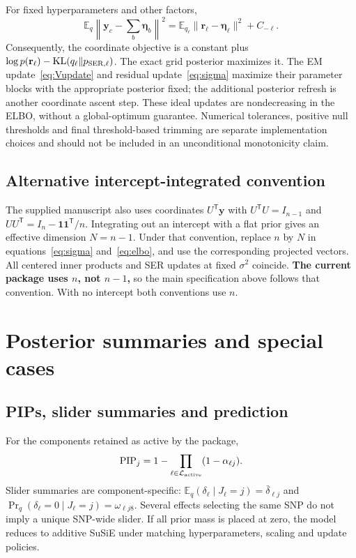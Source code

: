 \documentclass[11pt]{article}
\newcommand{\E}{\mathbb E}
\newcommand{\KL}{\operatorname{KL}}
\newcommand{\T}{^{\mathsf T}}
\newcommand{\yb}{\mathbf y_c}
\begin{document}
For fixed hyperparameters and other factors,
\begin{equation}
 \E_q\left\|\yb-\sum_b\boldsymbol\eta_b\right\|^2
 =\E_{q_\ell}\|\mathbf r_\ell-\boldsymbol\eta_\ell\|^2+C_{-\ell}.
 \label{eq:residual-identity}
\end{equation}
Consequently, the coordinate objective is a constant plus
$\log p(\mathbf r_\ell)-\KL(q_\ell\|p_{\rm SER,\ell})$.
The exact grid posterior maximizes it. The EM update~\eqref{eq:Vupdate}
and residual update~\eqref{eq:sigma} maximize their parameter blocks with
the appropriate posterior fixed; the additional posterior refresh is
another coordinate ascent step. These ideal updates are nondecreasing
in the ELBO, without a global-optimum guarantee. Numerical tolerances,
positive null thresholds and final threshold-based trimming are separate
implementation choices and should not be included in an unconditional
monotonicity claim.

\subsection{Alternative intercept-integrated convention}
\label{sec:intercept}
The supplied manuscript also uses coordinates $U\T\mathbf y$ with
$U\T U=I_{n-1}$ and $UU\T=I_n-\mathbf1\mathbf1\T/n$.
Integrating out an intercept with a flat prior gives an effective
dimension $N=n-1$. Under that convention, replace $n$ by $N$ in
equations~\eqref{eq:sigma} and~\eqref{eq:elbo}, and use the corresponding
projected vectors. All centered inner products and SER updates at fixed
$\sigma^2$ coincide. \textbf{The current package uses $n$, not $n-1$,}
so the main specification above follows that convention. With no
intercept both conventions use $n$.

\section{Posterior summaries and special cases}
\label{sec:summaries}
\subsection{PIPs, slider summaries and prediction}
For the components retained as active by the package,
\begin{equation}
 \operatorname{PIP}_j=1-\prod_{\ell\in\mathcal L_{\rm active}}
                          (1-\alpha_{\ell j}).
 \label{eq:pip}
\end{equation}
Slider summaries are component-specific:
$\E_q(\delta_\ell\mid J_\ell=j)=\bar\delta_{\ell j}$ and
$\Pr_q(\delta_\ell=0\mid J_\ell=j)=\omega_{\ell j8}$.
Several effects selecting the same SNP do not imply a unique SNP-wide
slider. If all prior mass is placed at zero, the model reduces to additive
SuSiE under matching hyperparameters, scaling and update policies.
\end{document}
